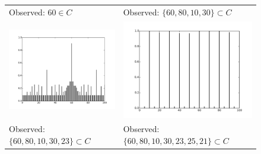 \documentclass[apacite,jou]{apa6}
\begin{document}
\begin{figure}
    \newcommand{\Scale}{0.42}
    
    \noindent
    \begin{tabular}{@{}p{}@{}p{}@{}}
    Observed: $60\in C$ & Observed: $\{60, 80, 10, 30\} \subset C$ \\
	\includegraphics[scale=\Scale]{ng60.pdf} &
	\includegraphics[scale=\Scale]{ng60801030.pdf}\\[2em]
	Observed: $\{60, 80, 10, 30, 23\} \subset C$ &
	Observed: $\{60, 80, 10, 30, 23, 25, 21\} \subset C$ \\

\end{tabular}
\end{figure}
\end{document}
